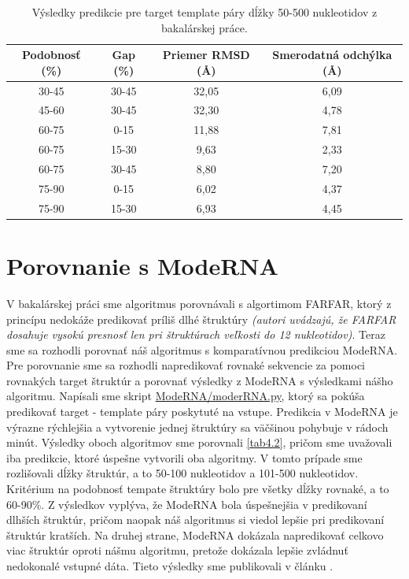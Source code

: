 \begin{table}[b!]
\centering
\begin{tabular}{cccc}
\toprule
Podobnosť (\%) & Gap (\%)  & Priemer RMSD (Å) & Smerodatná odchýlka  (Å)\\
\midrule
30-45  & 30-45 & 32,05 & 6,09 \\
45-60  & 30-45 & 32,30 & 4,78 \\
60-75  &   0-15 & 11,88 & 7,81 \\
60-75  & 15-30 &   9,63 & 2,33 \\
60-75  & 30-45 &   8,80 & 7,20 \\
75-90  &   0-15 &   6,02 & 4,37 \\
75-90  & 15-30 &   6,93 & 4,45 \\
\bottomrule
\end{tabular}
\caption{Výsledky predikcie pre target template páry dĺžky 50-500 nukleotidov z bakalárskej práce. }\label{tab4.1}
\end{table}


\section{Porovnanie s ModeRNA} \label{ModeRNA}
V bakalárskej práci sme algoritmus porovnávali s algortimom FARFAR, ktorý z princípu nedokáže predikovať príliš dlhé štruktúry \textit{(autori uvádzajú, že FARFAR dosahuje vysokú presnosť len pri štruktúrach veľkosti do 12 nukleotidov)}. Teraz sme sa rozhodli porovnať náš algoritmus s komparatívnou predikciou ModeRNA. Pre porovnanie sme sa rozhodli napredikovať rovnaké sekvencie za pomoci rovnakých target štruktúr a porovnať výsledky z ModeRNA s výsledkami nášho algoritmu. Napísali sme skript \url{ModeRNA/moderRNA.py}, ktorý sa pokúša predikovať target - template páry poskytuté na vstupe. Predikcia v ModeRNA je výrazne rýchlejšia a vytvorenie jednej štruktúry sa väčšinou pohybuje v rádoch minút. Výsledky oboch algoritmov sme porovnali \autoref{tab4.2}, pričom sme uvažovali iba predikcie, ktoré úspešne vytvorili oba algoritmy. V tomto prípade sme rozlišovali dĺžky štruktúr, a to 50-100 nukleotidov a 101-500 nukleotidov. Kritérium na podobnosť tempate štruktúry bolo pre všetky dĺžky rovnaké, a to 60-90\%. Z výsledkov vyplýva, že ModeRNA bola úspešnejšia v predikovaní dlhších štruktúr, pričom naopak náš algoritmus si viedol lepšie pri predikovaní štruktúr kratších. Na druhej strane, ModeRNA dokázala napredikovať celkovo viac štruktúr oproti nášmu algoritmu, pretože dokázala lepšie zvládnuť nedokonalé vstupné dáta. Tieto výsledky sme publikovali v článku \cite{7822808}.

